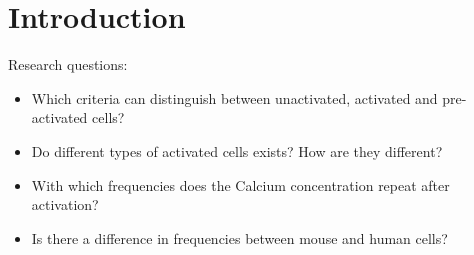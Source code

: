 \chapter{Introduction}
\label{chapter:introduction}

Research questions:
\begin{itemize}
	\item Which criteria can distinguish between unactivated, activated and pre-activated cells?
	\item Do different types of activated cells exists? How are they different?
	\item With which frequencies does the Calcium concentration repeat after activation?
	\item Is there a difference in frequencies between mouse and human cells?
\end{itemize}